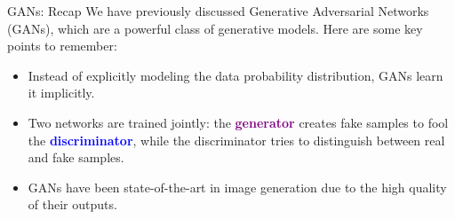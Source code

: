 \begin{frame}[allowframebreaks]{}
    \begin{figure}
        \centering
    \end{figure}
\end{frame}

\begin{frame}{GANs: Recap}
We have previously discussed Generative Adversarial Networks (GANs), 
which are a powerful class of generative models. 
Here are some key points to remember:
\begin{itemize}
    \item Instead of explicitly modeling the data probability distribution, GANs learn it implicitly.
    \item<2-> Two networks are trained jointly: the \textcolor{purple}{\textbf{generator}} creates fake samples to fool the \textcolor{blue}{\textbf{discriminator}}, while the discriminator tries to distinguish between real and fake samples.
    \item<3-> GANs have been state-of-the-art in image generation due to the high quality of their outputs.
\end{itemize}
\end{frame}
